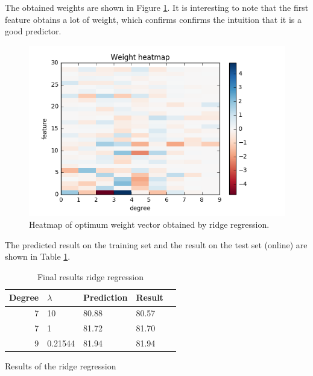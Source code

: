 The obtained weights are shown in Figure \ref{fig:weights}. It is interesting to
note that the first feature obtains a lot of weight, which confirms confirms the intuition that it is a good predictor.

\begin{figure}[htbp]
  \centering
  \includegraphics[width=.7\columnwidth]{figures/colormap29x9.png}
  \vspace{-3mm}
  \caption{Heatmap of optimum weight vector obtained by ridge regression.}
  \label{fig:weights}
\end{figure}

The predicted result on the training set and the result on the test set (online)
are shown in Table \ref{tab:ridge_regression}. 

\begin{table}[htbp]
  \centering
  \begin{tabular}[c]{r|l||l|l|l|}
    \hline
    Degree & $\lambda$ & Prediction & Result  \\
    \hline
    7       & 10      &80.88     &80.57 \\ 
    7       & 1       &81.72       &81.70 \\ 
    9       & 0.21544 &81.94       &81.94 \\ 
    \hline
  \end{tabular}
  \caption{Final results ridge regression}
  \label{tab:ridge_regression}
\end{table}

Results of the ridge regression


